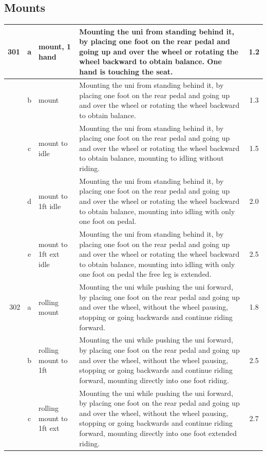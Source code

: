 \subsection{Mounts}
\begin{longtable}{|r|c|p{4cm}|p{8cm}|c|}
\hline
301 & a & mount, 1 hand & Mounting the uni from standing behind it, by placing one foot on the rear pedal and going up and over the wheel or rotating the wheel backward to obtain balance. One hand is touching the seat.  & 1.2 \\ 
\hline
  & b & mount & Mounting the uni from standing behind it, by placing one foot on the rear pedal and going up and over the wheel or rotating the wheel backward to obtain balance. & 1.3 \\ 
\hline
  & c & mount to idle & Mounting the uni from standing behind it, by placing one foot on the rear pedal and going up and over the wheel or rotating the wheel backward to obtain balance, mounting to idling without riding.  & 1.5 \\ 
\hline
  & d & mount to 1ft idle & Mounting the uni from standing behind it, by placing one foot on the rear pedal and going up and over the wheel or rotating the wheel backward to obtain balance, mounting into idling with only one foot on pedal. & 2.0 \\ 
\hline
  & e & mount to 1ft ext idle & Mounting the uni from standing behind it, by placing one foot on the rear pedal and going up and over the wheel or rotating the wheel backward to obtain balance, mounting into idling with only one foot on pedal the free leg is extended.  & 2.5 \\ 
\hline
302 & a & rolling mount & Mounting the uni while pushing the uni forward, by placing one foot on the rear pedal and going up and over the wheel, without the wheel pausing, stopping or going backwards and continue riding forward.  & 1.8 \\ 
\hline
  & b & rolling mount to 1ft  & Mounting the uni while pushing the uni forward, by placing one foot on the rear pedal and going up and over the wheel, without the wheel pausing, stopping or going backwards and continue riding forward, mounting directly into one foot riding.  & 2.5 \\ 
\hline
  & c & rolling mount to 1ft ext  & Mounting the uni while pushing the uni forward, by placing one foot on the rear pedal and going up and over the wheel, without the wheel pausing, stopping or going backwards and continue riding forward, mounting directly into one foot extended riding. & 2.7 \\ 

\end{longtable}
